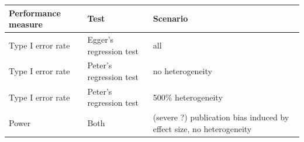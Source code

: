 \documentclass[
  english,
  doc,floatsintext,draftall]{apa6}
\begin{document}
\begin{longtable}[]{@{}lll@{}}
\toprule
\begin{minipage}[b]{0.30\columnwidth}\raggedright
Performance measure\strut
\end{minipage} & \begin{minipage}[b]{0.30\columnwidth}\raggedright
Test\strut
\end{minipage} & \begin{minipage}[b]{0.30\columnwidth}\raggedright
Scenario\strut
\end{minipage}\tabularnewline
\midrule
\endhead
\begin{minipage}[t]{0.30\columnwidth}\raggedright
Type I error rate\strut
\end{minipage} & \begin{minipage}[t]{0.30\columnwidth}\raggedright
Egger's regression test\strut
\end{minipage} & \begin{minipage}[t]{0.30\columnwidth}\raggedright
all\strut
\end{minipage}\tabularnewline
\begin{minipage}[t]{0.30\columnwidth}\raggedright
Type I error rate\strut
\end{minipage} & \begin{minipage}[t]{0.30\columnwidth}\raggedright
Peter's regression test\strut
\end{minipage} & \begin{minipage}[t]{0.30\columnwidth}\raggedright
no heterogeneity\strut
\end{minipage}\tabularnewline
\begin{minipage}[t]{0.30\columnwidth}\raggedright
Type I error rate\strut
\end{minipage} & \begin{minipage}[t]{0.30\columnwidth}\raggedright
Peter's regression test\strut
\end{minipage} & \begin{minipage}[t]{0.30\columnwidth}\raggedright
500\% heterogeneity\strut
\end{minipage}\tabularnewline
\begin{minipage}[t]{0.30\columnwidth}\raggedright
Power\strut
\end{minipage} & \begin{minipage}[t]{0.30\columnwidth}\raggedright
Both\strut
\end{minipage} & \begin{minipage}[t]{0.30\columnwidth}\raggedright
(severe ?) publication bias induced by effect size, no heterogeneity\strut

\end{minipage}
\end{longtable}
\end{document}
